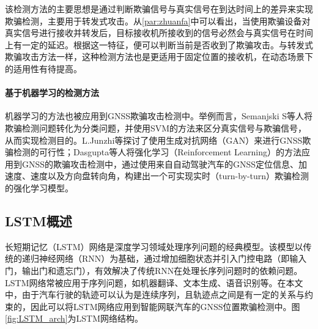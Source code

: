 该检测方法的主要思想是通过判断欺骗信号与真实信号在到达时间上的差异来实现欺骗检测，主要用于转发式攻击。从\ref{par:zhuanfa}中可以看出，当使用欺骗设备对真实信号进行接收并转发后，目标接收机所接收到的信号必然会与真实信号在时间上有一定的延迟。根据这一特征，便可以判断当前是否收到了欺骗攻击。与转发式欺骗攻击方法一样，这种检测方法也是更适用于固定位置的接收机，在动态场景下的适用性有待提高\cite{周彦2022GNSS欺骗检测}。

\paragraph{基于机器学习的检测方法}
机器学习的方法也被应用到GNSS欺骗攻击检测中。举例而言，Semanjski S等人\cite{semanjski2020gnss}将欺骗检测问题转化为分类问题，并使用SVM的方法来区分真实信号与欺骗信号，从而实现检测目的。L.Junzhi等\cite{Junzhi2019gan}探讨了使用生成对抗网络（GAN）来进行GNSS欺骗检测的可行性；Dasgupta等人\cite{dasgupta2021reinforcement}将强化学习（Reinforcement Learning）的方法应用到GNSS的欺骗攻击检测中，通过使用来自自动驾驶汽车的GNSS定位信息、加速度、速度以及方向盘转向角，构建出一个可实现实时（turn-by-turn）欺骗检测的强化学习模型。


\subsection{LSTM概述}
\label{sec:LSTM_gaishu}
长短期记忆（LSTM）网络是深度学习领域处理序列问题的经典模型。该模型以传统的递归神经网络（RNN）为基础，通过增加细胞状态并引入门控电路（即输入门，输出门和遗忘门），有效解决了传统RNN在处理长序列问题时的依赖问题。LSTM网络常被应用于序列问题，如机器翻译、文本生成、语音识别等。在本文中，由于汽车行驶的轨迹可以认为是连续序列，且轨迹点之间是有一定的关系与约束的，因此可以将LSTM网络应用到智能网联汽车的GNSS位置欺骗检测中。图\ref{fig:LSTM_arch}为LSTM网络结构。

